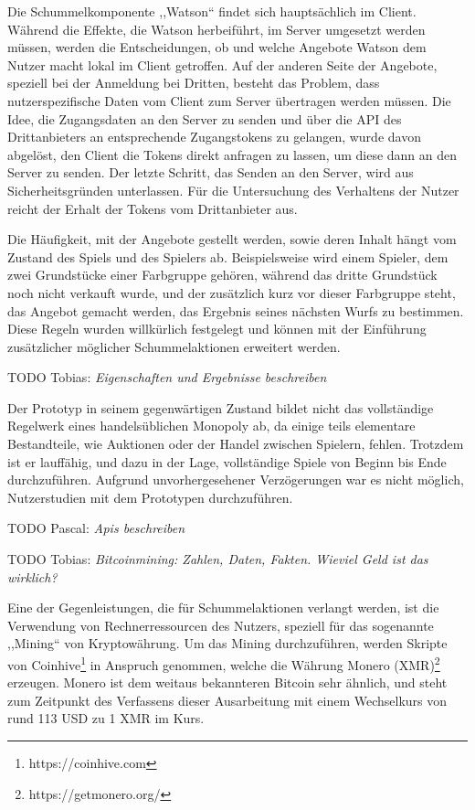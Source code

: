 \documentclass[german]{cgspaper} %
\newcommand{\todo}[1]{\textit{#1}}
\newcommand{\Pascal}[1]{\textcolor{colorPascal}{TODO Pascal:} \todo{#1} }
\newcommand{\Tobias}[1]{\textcolor{colorTobias}{TODO Tobias:} \todo{#1} }
\begin{document}
Die Schummelkomponente ,,Watson`` findet sich hauptsächlich im Client.
Während die Effekte, die Watson herbeiführt, im Server umgesetzt werden müssen, werden die Entscheidungen, ob und welche Angebote Watson dem Nutzer macht lokal im Client getroffen.
Auf der anderen Seite der Angebote, speziell bei der Anmeldung bei Dritten, besteht das Problem, dass nutzerspezifische Daten vom Client zum Server übertragen werden müssen.
Die Idee, die Zugangsdaten an den Server zu senden und über die API des Drittanbieters an entsprechende Zugangstokens zu gelangen, wurde davon abgelöst, den Client die Tokens direkt anfragen zu lassen, um diese dann an den Server zu senden.
Der letzte Schritt, das Senden an den Server, wird aus Sicherheitsgründen unterlassen. Für die Untersuchung des Verhaltens der Nutzer reicht der Erhalt der Tokens vom Drittanbieter aus.

Die Häufigkeit, mit der Angebote gestellt werden, sowie deren Inhalt hängt vom Zustand des Spiels und des Spielers ab.
Beispielsweise wird einem Spieler, dem zwei Grundstücke einer Farbgruppe gehören, während das dritte Grundstück noch nicht verkauft wurde, und der zusätzlich kurz vor dieser Farbgruppe steht, das Angebot gemacht werden, das Ergebnis seines nächsten Wurfs zu bestimmen.
Diese Regeln wurden willkürlich festgelegt und können mit der Einführung zusätzlicher möglicher Schummelaktionen erweitert werden.

\Tobias{Eigenschaften und Ergebnisse beschreiben}

Der Prototyp in seinem gegenwärtigen Zustand bildet nicht das vollständige Regelwerk eines handelsüblichen Monopoly ab, da einige teils elementare Bestandteile, wie Auktionen oder der Handel zwischen Spielern, fehlen.
Trotzdem ist er lauffähig, und dazu in der Lage, vollständige Spiele von Beginn bis Ende durchzuführen.
Aufgrund unvorhergesehener Verzögerungen war es nicht möglich, Nutzerstudien mit dem Prototypen durchzuführen.

\Pascal{Apis beschreiben}

\Tobias{Bitcoinmining: Zahlen, Daten, Fakten. Wieviel Geld ist das wirklich?}

Eine der Gegenleistungen, die für Schummelaktionen verlangt werden, ist die Verwendung von Rechnerressourcen des Nutzers, speziell für das sogenannte ,,Mining`` von Kryptowährung.
Um das Mining durchzuführen, werden Skripte von Coinhive\footnote{https://coinhive.com} in Anspruch genommen, welche die Währung Monero (XMR)\footnote{https://getmonero.org/} erzeugen.
Monero ist dem weitaus bekannteren Bitcoin sehr ähnlich, und steht zum Zeitpunkt des Verfassens dieser Ausarbeitung mit einem Wechselkurs von rund 113 USD zu 1 XMR im Kurs.
\end{document}
